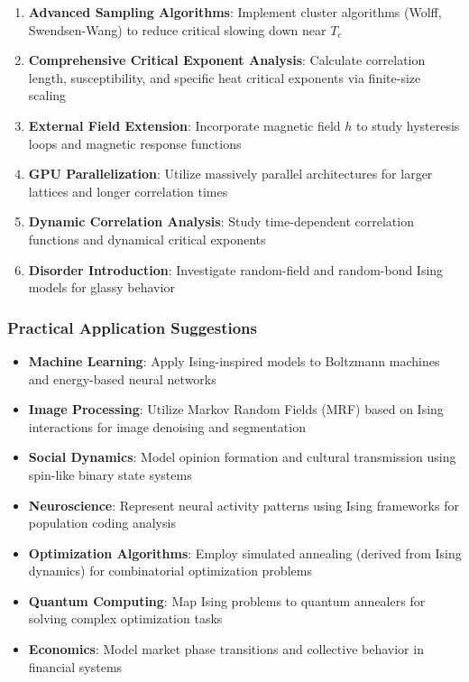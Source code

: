 \documentclass[11pt]{article}
\providecommand{\tightlist}{%
      \setlength{\itemsep}{0pt}\setlength{\parskip}{0pt}}
\begin{document}
\begin{enumerate}
\def\labelenumi{\arabic{enumi}.}
\tightlist
\item
  \textbf{Advanced Sampling Algorithms}: Implement cluster algorithms
  (Wolff, Swendsen-Wang) to reduce critical slowing down near \(T_c\)
\item
  \textbf{Comprehensive Critical Exponent Analysis}: Calculate
  correlation length, susceptibility, and specific heat critical
  exponents via finite-size scaling
\item
  \textbf{External Field Extension}: Incorporate magnetic field \(h\) to
  study hysteresis loops and magnetic response functions
\item
  \textbf{GPU Parallelization}: Utilize massively parallel architectures
  for larger lattices and longer correlation times
\item
  \textbf{Dynamic Correlation Analysis}: Study time-dependent
  correlation functions and dynamical critical exponents
\item
  \textbf{Disorder Introduction}: Investigate random-field and
  random-bond Ising models for glassy behavior
\end{enumerate}

\subsubsection{Practical Application
Suggestions}\label{practical-application-suggestions}

\begin{itemize}
\tightlist
\item
  \textbf{Machine Learning}: Apply Ising-inspired models to Boltzmann
  machines and energy-based neural networks
\item
  \textbf{Image Processing}: Utilize Markov Random Fields (MRF) based on
  Ising interactions for image denoising and segmentation
\item
  \textbf{Social Dynamics}: Model opinion formation and cultural
  transmission using spin-like binary state systems
\item
  \textbf{Neuroscience}: Represent neural activity patterns using Ising
  frameworks for population coding analysis
\item
  \textbf{Optimization Algorithms}: Employ simulated annealing (derived
  from Ising dynamics) for combinatorial optimization problems
\item
  \textbf{Quantum Computing}: Map Ising problems to quantum annealers
  for solving complex optimization tasks
\item
  \textbf{Economics}: Model market phase transitions and collective
  behavior in financial systems
\end{itemize}
\end{document}
